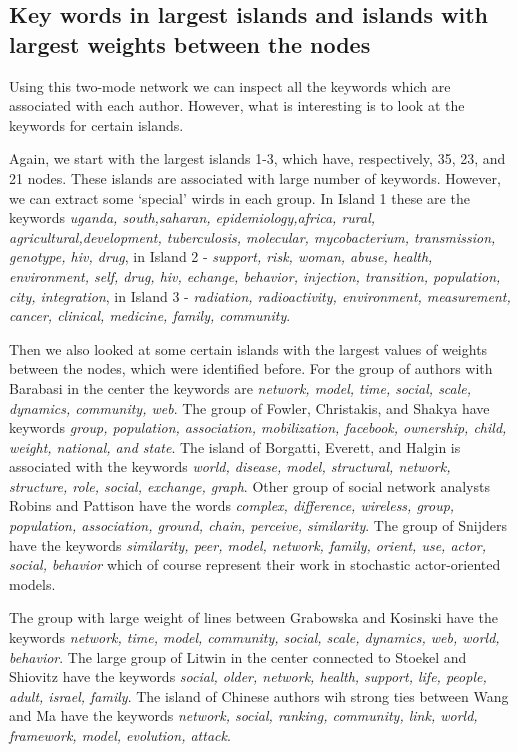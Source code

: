 \documentclass[11pt]{article} %
\begin{document}
\subsection{Key words in largest islands and islands with largest weights between the nodes}  

Using this two-mode network we can inspect all the keywords which are associated with each author. However, what is interesting is to look at the keywords for certain islands. \medskip

Again, we start with the largest islands 1-3, which have, respectively, 35, 23, and 21 nodes. These islands are associated with large number of keywords. However, we can extract some `special' wirds in each group. In Island 1 these are the keywords \textit{uganda, south,saharan, epidemiology,africa,  rural, agricultural,development, tuberculosis, molecular, mycobacterium, transmission, genotype, hiv, drug}, in Island 2 - \textit{support, risk, woman, abuse, health, environment, self, drug, hiv, echange, behavior, injection, transition, population, city, integration}, in Island 3 - \textit{radiation, radioactivity, environment, measurement, cancer, clinical, medicine, family, community}.  \medskip

Then we also looked at some certain islands with the largest values of weights between the nodes, which were identified before. For the group of authors with Barabasi in the center the keywords are \textit{network, model, time, social, scale, dynamics, community, web}. The group of Fowler, Christakis, and Shakya have keywords \textit{group, population, association, mobilization, facebook,  ownership, child, weight, national, and state}. The island of Borgatti,  Everett, and Halgin is associated with the keywords \textit{world, disease, model, structural, network, structure, role, social, exchange, graph}.  Other group of social network analysts Robins and Pattison have the words \textit{complex, difference, wireless, group, population, association, ground, chain, perceive, similarity}. The group of Snijders have the keywords \textit{similarity, peer, model, network, family, orient, use, actor, social, behavior} which of course represent their work in stochastic actor-oriented models. \medskip

The group with large weight of lines between Grabowska and Kosinski have the keywords \textit{network, time, model, community, social, scale, dynamics, web, world, behavior}. The large group of Litwin in the center connected to Stoekel and Shiovitz have the keywords \textit{social, older,  network, health, support, life, people, adult, israel, family}. The island of  Chinese authors wih strong ties between Wang and Ma have the keywords \textit{network, social, ranking, community, link, world, framework, model, evolution, attack}. \medskip
\end{document}
